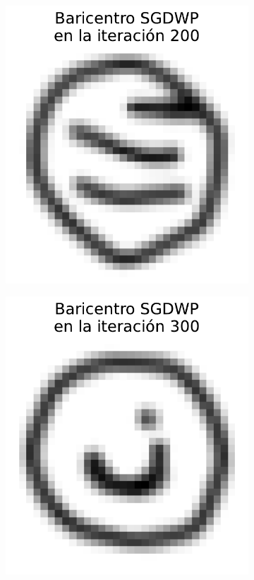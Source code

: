 \begin{figure}[H]
\begin{subfigure}[b]{0.17\textwidth}
        \includegraphics[width=\textwidth]{img/sgdwp-rw/bar-SGDWP-random-walk-iter-02.pdf}
        \label{fig:bar-SGDWP-random-walk-iter-02}
    \end{subfigure}
    \hfill
    \begin{subfigure}[b]{0.17\textwidth}
        \centering
        \includegraphics[width=\textwidth]{img/sgdwp-rw/bar-SGDWP-random-walk-iter-03.pdf}

\end{subfigure}
\end{figure}
